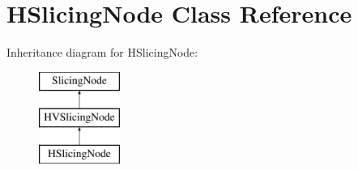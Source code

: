 \hypertarget{class_open_chams_1_1_h_slicing_node}{\section{H\-Slicing\-Node Class Reference}
\label{class_open_chams_1_1_h_slicing_node}
}
Inheritance diagram for H\-Slicing\-Node\-:\begin{figure}[H]
\begin{center}
\leavevmode
\includegraphics[height=3.000000cm]{class_open_chams_1_1_h_slicing_node}
\end{center}
\end{figure}
